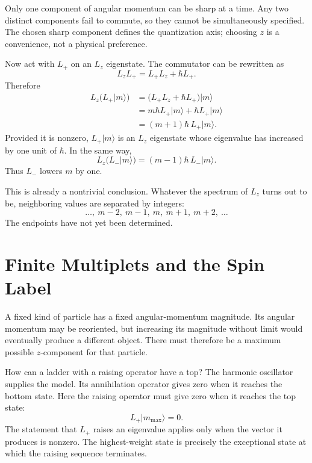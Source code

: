 Only one component of angular momentum can be sharp at a time. Any two distinct components fail to commute, so they cannot be simultaneously specified. The chosen sharp component defines the quantization axis; choosing \(z\) is a convenience, not a physical preference.

Now act with \(L_+\) on an \(L_z\) eigenstate. The commutator can be rewritten as
\begin{equation}
L_zL_+=L_+L_z+\hbar L_+.
\end{equation}
Therefore
\begin{align}
L_z\bigl(L_+\lvert m\rangle\bigr)
&=\bigl(L_+L_z+\hbar L_+\bigr)\lvert m\rangle \\
&=m\hbar L_+\lvert m\rangle+\hbar L_+\lvert m\rangle \\
&=(m+1)\hbar\,L_+\lvert m\rangle.
\end{align}
Provided it is nonzero, \(L_+\lvert m\rangle\) is an \(L_z\) eigenstate whose eigenvalue has increased by one unit of \(\hbar\). In the same way,
\begin{equation}
L_z\bigl(L_-\lvert m\rangle\bigr)
=(m-1)\hbar\,L_-\lvert m\rangle.
\end{equation}
Thus \(L_-\) lowers \(m\) by one.

This is already a nontrivial conclusion. Whatever the spectrum of \(L_z\) turns out to be, neighboring values are separated by integers:
\begin{equation}
\ldots,\ m-2,\ m-1,\ m,\ m+1,\ m+2,\ \ldots
\end{equation}
The endpoints have not yet been determined.

\section{Finite Multiplets and the Spin Label}

A fixed kind of particle has a fixed angular-momentum magnitude. Its angular momentum may be reoriented, but increasing its magnitude without limit would eventually produce a different object. There must therefore be a maximum possible \(z\)-component for that particle.

How can a ladder with a raising operator have a top? The harmonic oscillator supplies the model. Its annihilation operator gives zero when it reaches the bottom state. Here the raising operator must give zero when it reaches the top state:
\begin{equation}
L_+\lvert m_{\max}\rangle=0.
\end{equation}
The statement that \(L_+\) raises an eigenvalue applies only when the vector it produces is nonzero. The highest-weight state is precisely the exceptional state at which the raising sequence terminates.


